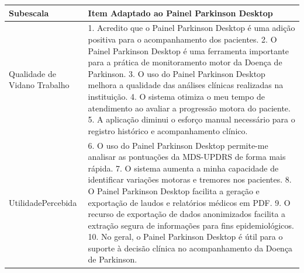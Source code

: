 \begin{quadro}[H]
    \centering
    \footnotesize
    \caption{Itens do Health-ITUES adaptados para a avaliação do Painel Parkinson Desktop.}
    \label{quadro:health_itues_itens}
    \begin{tabular}{|p{4cm}|p{10.5cm}|}
    \hline
    \textbf{Subescala} & \textbf{Item Adaptado ao Painel Parkinson Desktop} \\ \hline

    Qualidade de Vida\newline no Trabalho
    & 1. Acredito que o Painel Parkinson Desktop é uma adição positiva para o acompanhamento dos pacientes. \newline \vspace{0.15cm}
    2. O Painel Parkinson Desktop é uma ferramenta importante para a prática de monitoramento motor da Doença de Parkinson. \newline \vspace{0.15cm}
    3. O uso do Painel Parkinson Desktop melhora a qualidade das análises clínicas realizadas na instituição. \newline \vspace{0.15cm}
    4. O sistema otimiza o meu tempo de atendimento ao avaliar a progressão motora do paciente. \newline \vspace{0.15cm}
    5. A aplicação diminui o esforço manual necessário para o registro histórico e acompanhamento clínico. \\ \hline

    Utilidade\newline Percebida
    & 6. O uso do Painel Parkinson Desktop permite-me analisar as pontuações da MDS-UPDRS de forma mais rápida. \newline \vspace{0.15cm}
    7. O sistema aumenta a minha capacidade de identificar variações motoras e tremores nos pacientes. \newline \vspace{0.15cm}
    8. O Painel Parkinson Desktop facilita a geração e exportação de laudos e relatórios médicos em PDF. \newline \vspace{0.15cm}
    9. O recurso de exportação de dados anonimizados facilita a extração segura de informações para fins epidemiológicos. \newline \vspace{0.15cm}
    10. No geral, o Painel Parkinson Desktop é útil para o suporte à decisão clínica no acompanhamento da Doença de Parkinson. \\ \hline


\end{tabular}
\end{quadro}

